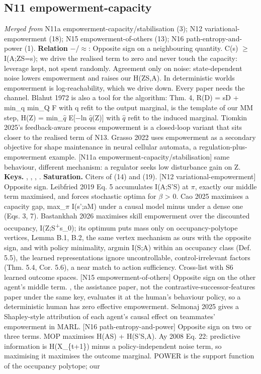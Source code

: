 \documentclass[10pt]{article}
\begin{document}
\subsection{N11 empowerment-capacity}\label{node:S3-N11-empowerment-capacity}
\textit{Merged from} N11a empowerment-capacity/stabilisation (3); N12 variational-empowerment (18); N15 empowerment-of-others (13); N16 path-entropy-and-power (1). \textbf{Relation} $-$/$\approx$: Opposite sign on a neighbouring quantity. C(s) \ensuremath{\geq} I(A;Z\textbar{}S=s); we drive the realised term to zero and never touch the capacity: leverage kept, not spent randomly. Agreement only on noise: state-dependent noise lowers empowerment and raises our H(Z\textbar{}S,A). In deterministic worlds empowerment is log-reachability, which we drive down. Every paper needs the channel. Blahut 1972 is also a tool for the algorithm: Thm. 4, R(D) = sD + min\_q min\_Q F with q refit to the output marginal, is the template of our MM step, H(Z) = min\_\ensuremath{\hat{q}} E[\ensuremath{-}ln \ensuremath{\hat{q}}(Z)] with \ensuremath{\hat{q}} refit to the induced marginal. Tiomkin 2025's feedback-aware process empowerment is a closed-loop variant that sits closer to the realised term of N13. Grasso 2022 uses empowerment as a secondary objective for shape maintenance in neural cellular automata, a regulation-plus-empowerment example. [N11a empowerment-capacity/stabilisation] same behaviour, different mechanism: a regulator seeks low disturbance gain on Z. \textbf{Keys.} \citet{Zhao-efficient20}, \citet{Tiomkin-intrinsic22}, \citet{Jung-empowerment11}, \citet{CatenacciVolpi-skilled23}. \textbf{Saturation.} Citers of \citet{Zhao-efficient20} (14) and \citet{Tiomkin-intrinsic22} (19). [N12 variational-empowerment] Opposite sign. Leibfried 2019 Eq. 5 accumulates I(A;S'\textbar{}S) at \ensuremath{\pi}, exactly our middle term maximised, and forces stochastic optima for \ensuremath{\beta} \textgreater{} 0. Cao 2025 maximises a capacity gap, max\_\ensuremath{\pi} I(s';a\textbar{}M) under a causal model minus under a dense one (Eqs. 3, 7). Bastankhah 2026 maximises skill empowerment over the discounted occupancy, I(Z;S\textsuperscript{+}\textbar{}s\_0); its optimum puts mass only on occupancy-polytope vertices, Lemma B.1, B.2, the same vertex mechanism as ours with the opposite sign, and with policy minimality, argmin I(S;A) within an occupancy class (Def. 5.5), the learned representations ignore uncontrollable, control-irrelevant factors (Thm. 5.4, Cor. 5.6), a near match to action sufficiency. Cross-list with S6 learned outcome spaces. [N15 empowerment-of-others] Opposite sign on the other agent's middle term. \citet{Myers-learning24}, the assistance paper, not the contrastive-successor-features paper under the same key, evaluates it at the human's behaviour policy, so a deterministic human has zero effective empowerment. Selmonaj 2025 gives a Shapley-style attribution of each agent's causal effect on teammates' empowerment in MARL. [N16 path-entropy-and-power] Opposite sign on two or three terms. MOP maximises H(A\textbar{}S) + H(S'\textbar{}S,A). Ay 2008 Eq. 22: predictive information is H(X\_\{t+1\}) minus a policy-independent noise term, so maximising it maximises the outcome marginal. POWER is the support function of the occupancy polytope; our 
\end{document}
